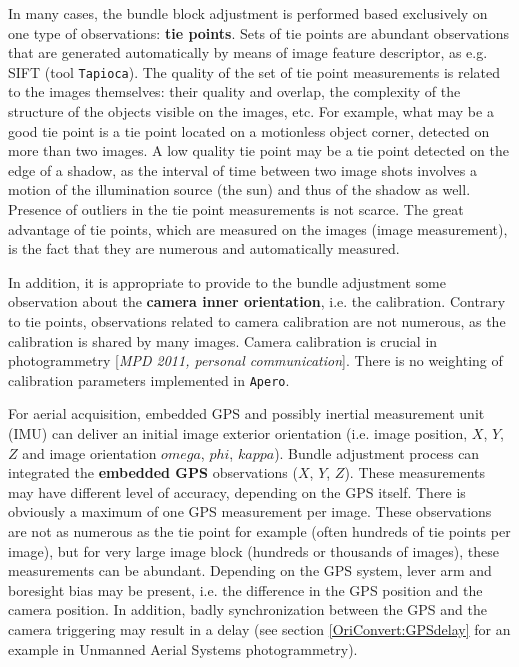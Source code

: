 In many cases, the bundle block adjustment is performed based exclusively on one type of observations: {\bf tie points}.
Sets of tie points are abundant observations that are generated automatically by means of image feature descriptor, as e.g. SIFT (tool {\tt Tapioca}).
The quality of the set of tie point measurements is related to the images themselves: their quality and overlap, the complexity of the structure of the objects visible on the images, etc. For example, what may be a good tie point is a tie point located on a motionless object corner, detected on more than two images. A low quality tie point may be a tie point detected on the edge of a shadow, as the interval of time between two image shots involves a motion of the illumination source (the sun) and thus of the shadow as well. Presence of outliers in the tie point measurements is not scarce.
The great advantage of tie points, which are measured on the images (image measurement), is the fact that they are numerous and automatically measured.

In addition, it is appropriate to provide to the bundle adjustment some observation about the {\bf camera inner orientation}, i.e. the calibration.
Contrary to tie points, observations related to camera calibration are not numerous, as the calibration is shared by many images.
Camera calibration is crucial in photogrammetry [{\it MPD 2011, personal communication}].
There is no weighting of calibration parameters implemented in {\tt Apero}.

For aerial acquisition, embedded GPS and possibly inertial measurement unit (IMU) can deliver an initial image exterior orientation (i.e. image position, $X$, $Y$, $Z$ and image orientation $omega$, $phi$, $kappa$).
Bundle adjustment process can integrated the {\bf embedded GPS} observations ($X$, $Y$, $Z$).
These measurements may have different level of accuracy, depending on the GPS itself.
There is obviously a maximum of one GPS measurement per image.
These observations are not as numerous as the tie point for example (often hundreds of tie points per image), but for very large image block (hundreds or thousands of images), these measurements can be abundant.
Depending on the GPS system, lever arm and boresight bias may be present, i.e. the difference in the GPS position and the camera position.
In addition, badly synchronization between the GPS and the camera triggering may result in a delay (see section \ref{OriConvert:GPSdelay} for an example in Unmanned Aerial Systems photogrammetry).

